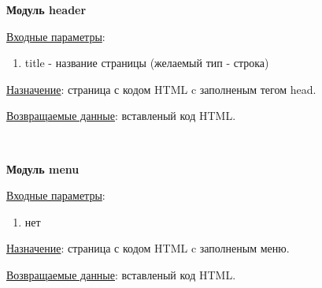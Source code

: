 
\textbf{Модуль header}

\underline{Входные параметры}:

\begin{enumerate}
    \item title - название страницы (желаемый тип - строка)
\end{enumerate}

\underline{Назначение}: страница с кодом HTML c заполненым тегом head.

\underline{Возвращаемые данные}: вставленый код HTML.

\hspace{0pt}\\


\newpage

\textbf{Модуль menu}

\underline{Входные параметры}:

\begin{enumerate}
    \item нет
\end{enumerate}

\underline{Назначение}: страница с кодом HTML c заполненым меню.

\underline{Возвращаемые данные}: вставленый код HTML.

\hspace{0pt}\\


\newpage